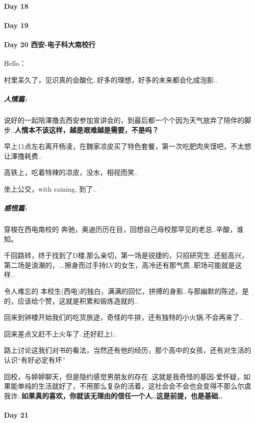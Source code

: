 \documentclass[UTF8,a4paper,8pt]{ctexbook}
\begin{document}
 	 \paragraph{Day 18      \quad     }
 	 \paragraph{Day 19      \quad     }
 	 \paragraph{Day 20   西安-电子科大南校行   \quad     }Hello：
 	 
	 	 村里呆久了，见识真的会酸化..好多的理想，好多的未来都会化成泡影..
	 	 
	 	 \subparagraph{人情篇:}说好的一起陪澤撸去西安参加宣讲会的，到最后都一个个因为天气放弃了陪伴的脚步..\textbf{人情本不该这样，越是艰难越是需要，不是吗？}
	 	 
	 	 早上11点左右离开杨凌，在魏家凉皮买了特色套餐，第一次吃肥肉夹馍吧，不太想让澤撸耗费..
	 	 
	 	 高铁上，吃着特辣的凉皮，没水，相视而笑..
	 	 
	 	 坐上公交，with raining, 到了..
	 	 
	 	 \subparagraph{感悟篇:}穿梭在西电南校的 奔驰，奥迪历历在目，回想自己母校那罕见的老总..辛酸，谁知。
	 	 
	 	 千回路转，终于找到了D楼,那么亲切，第一场是锐捷的，只招研究生..还挺高兴，第二场是浪潮的，...擦身而过手持LV的女生，高冷还有那气质..职场可能就是这样..
	 	 
	 	 令人难忘的 本校生(西电)的独白，满满的回忆，拼搏的身影..与那幽默的陈述，是的，应该给个赞，这就是积累和锻炼造就的..
	 	 
	 	 回来到钟楼开始我们的吃货旅途，奇怪的牛排，还有独特的小火锅,不会再来了..
	 	 
	 	 回来差点又赶不上火车了..还好赶上l..
	 	 
	 	 路上讨论这我们对书的看法，当然还有他的经历，那个高中的女孩，还有对生活的认识“有好必定有坏”
	 	 
	 	 回校，与婷婷聊天，但是隐约感觉男朋友的存在..这就是我奇怪的基因-爱怀疑，如果能单纯的生活就好了，不用那么复杂的活着，这社会会不会也会变得不那么尔虞我诈..\textbf{如果真的喜欢，你就该无理由的信任一个人..这是前提，也是基础..}
	 	 
 	 \paragraph{Day 21      \quad     }
\end{document}
